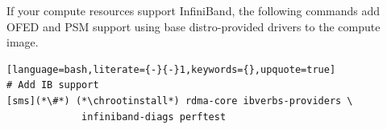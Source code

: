 If your compute resources support InfiniBand, the following commands add OFED
and PSM support using base distro-provided drivers to the compute image.

\begin{lstlisting}[language=bash,literate={-}{-}1,keywords={},upquote=true]
# Add IB support
[sms](*\#*) (*\chrootinstall*) rdma-core ibverbs-providers \
             infiniband-diags perftest
\end{lstlisting}
